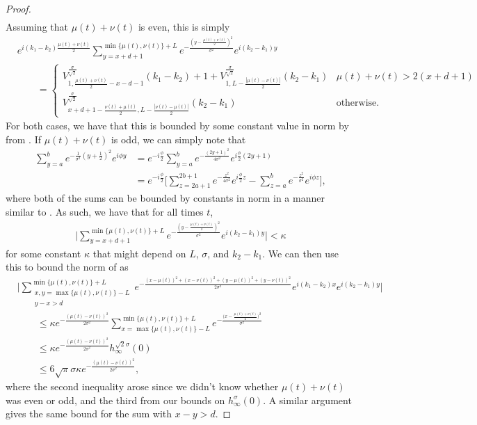 \documentclass[../thesis-main/thesis-main]{subfiles}
\begin{document}
\begin{proof}
\begin{align}
\end{align}
Assuming that $\mu(t)+\nu(t)$ is even, this is simply
\begin{align}
   &e^{i (k_1 - k_2) \frac{\mu(t) + \nu(t)}{2}}\sum_{y=x+d+1}^{\min\{\mu(t),\nu(t)\}+L} e^{-\frac{(y - \frac{\mu(t)+\nu(t)}{2})^2}{\sigma^2}} e^{i (k_2-k_1)y}\nonumber\\
    &\qquad =\begin{cases} V_{1,\frac{\mu(t)+\nu(t)}{2} - x - d - 1}^{\frac{\sigma}{\sqrt{2}}}(k_1-k_2) + 1 + V_{1,L -\frac{ |\mu(t) - \nu(t)|}{2}}^{\frac{\sigma}{\sqrt{2}}}(k_2-k_1) & \mu(t) + \nu(t) > 2(x+d+1)\\
     V_{x+d+1-\frac{\nu(t)+\mu(t)}{2},L-\frac{|\nu(t)-\mu(t)|}{2}}^{\frac{\sigma}{\sqrt{2}}}(k_2-k_1) & \text{otherwise.}  
   \end{cases}\label{eq:overlap_y_sums}
\end{align}
For both cases, we have that this is bounded by some constant value in norm by  from .   If $\mu(t) + \nu(t)$ is odd, we can simply note that
\begin{align}
  \sum_{y=a}^b e^{-\frac{1}{\sigma^2}(y + \frac{1}{2})^2} e^{ i \phi y} &= e^{-i \frac{\phi}{2}} \sum_{y = a}^{b} e^{ - \frac{(2y + 1)^2}{4\sigma^2}} e^{ i \frac{\phi}{2} (2y + 1)}\\
  & = e^{ - i\frac{\phi}{2}} \Bigg[\sum_{z = 2a + 1}^{2b+1} e^{-\frac{z^2}{4\sigma^2} }e^{i \frac{\phi}{2} z}  - \sum_{z = a}^b e^{-\frac{z^2}{\sigma^2}} e^{i \phi z}\Bigg],
\end{align}
where both of the sums can be bounded by constants in norm in a manner similar to .  As such, we have that for all times $t$,
\begin{align}
  \Bigg|\sum_{y =x+d+1}^{\min\{\mu(t),\nu(t)\} + L} e^{-\frac{(y-\frac{\mu(t)+\nu(t)}{2})^2}{\sigma^2}} e^{i (k_2-k_1)y} \Bigg| < \kappa
\end{align}
for some constant $\kappa$ that might depend on $L$, $\sigma$, and $k_2-k_1$.  We can then use this to bound the norm of  as
\begin{align}
  &\Bigg|\sum_{\substack{x,y=\max\{\mu(t),\nu(t)\}-L\\y-x > d}}^{\min\{\mu(t),\nu(t)\}+L}  e^{-\frac{(x-\mu(t))^2 + (x-\nu(t))^2 + (y-\mu(t))^2+(y-\nu(t))^2}{2\sigma^2}} e^{i (k_1 - k_2) x}e^{i (k_2 - k_1) y}\Bigg|\nonumber\\
  &\qquad \leq \kappa e^{- \frac{(\mu(t) - \nu(t))^2}{2\sigma^2}} \sum_{x=\max\{\mu(t),\nu(t) \}-L}^{\min\{\mu(t),\nu(t)\}+L} e^{ - \frac{\big( x - \frac{\mu(t) + \nu(t)}{2}\big)^2}{\sigma^2}}\\
  &\qquad \leq \kappa e^{-\frac{(\mu(t)-\nu(t))^2}{2\sigma^2}} h_{\infty}^{\sqrt{2}\sigma}(0)\\
  &\qquad \leq 6\sqrt{\pi} \sigma \kappa e^{-\frac{(\mu(t)-\nu(t))^2}{2\sigma^2}},
\end{align}
where the second inequality arose since we didn't know whether $\mu(t)+\nu(t)$ was even or odd, and the third from our bounds on $h_{\infty}^\sigma(0)$.  A similar argument gives the same bound for the sum with $x-y > d$.


\end{proof}
\end{document}
